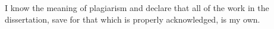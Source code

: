 {
  \makeatletter
    \thispagestyle{empty}
    \renewcommand{\thefootnote}{}
    \mbox{}\vfill
    I know the meaning of plagiarism and declare that all of the work in the dissertation, save for that which is properly acknowledged, is my own.

    \vspace{15mm}

    \mbox{}\hfill\begin{minipage}{65mm}%
      \dotfill\\[1ex]%
      \@author
    \end{minipage}
    \vfill\vfill\vfill
  \makeatother
  \clearpage
}
